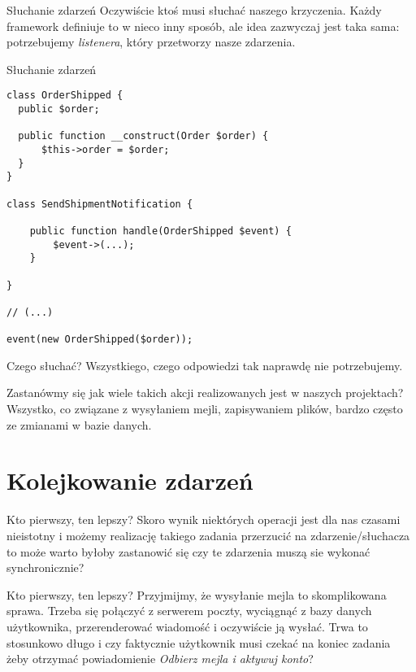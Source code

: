 \begin{frame}{Słuchanie zdarzeń}
	Oczywiście ktoś musi słuchać naszego krzyczenia. Każdy framework definiuje to w nieco inny sposób, ale idea zazwyczaj jest taka sama: potrzebujemy \emph{listenera}, który przetworzy nasze zdarzenia.
\end{frame}

\begin{frame}[fragile]{Słuchanie zdarzeń}
\begin{lstlisting}
class OrderShipped {
  public $order;
  
  public function __construct(Order $order) {
      $this->order = $order;
  }
}

class SendShipmentNotification {

    public function handle(OrderShipped $event) {
        $event->(...);
    }

}

// (...)

event(new OrderShipped($order));
\end{lstlisting}
\end{frame}

\begin{frame}{Czego słuchać?}
	Wszystkiego, czego odpowiedzi tak naprawdę nie potrzebujemy.
	
	Zastanówmy się jak wiele takich akcji realizowanych jest w naszych projektach? Wszystko, co związane z wysyłaniem mejli, zapisywaniem plików, bardzo często ze zmianami w bazie danych.
\end{frame}

\section{Kolejkowanie zdarzeń}

\begin{frame}{Kto pierwszy, ten lepszy?}
	Skoro wynik niektórych operacji jest dla nas czasami nieistotny i możemy realizację takiego zadania przerzucić na zdarzenie/słuchacza to może warto byłoby zastanowić się czy te zdarzenia muszą sie wykonać synchronicznie?
\end{frame}

\begin{frame}{Kto pierwszy, ten lepszy?}
	Przyjmijmy, że wysyłanie mejla to skomplikowana sprawa. Trzeba się połączyć z serwerem poczty, wyciągnąć z bazy danych użytkownika, przerenderować wiadomość i oczywiście ją wysłać. Trwa to stosunkowo długo i czy faktycznie użytkownik musi czekać na koniec zadania żeby otrzymać powiadomienie \emph{Odbierz mejla i aktywuj konto}?
\end{frame}


